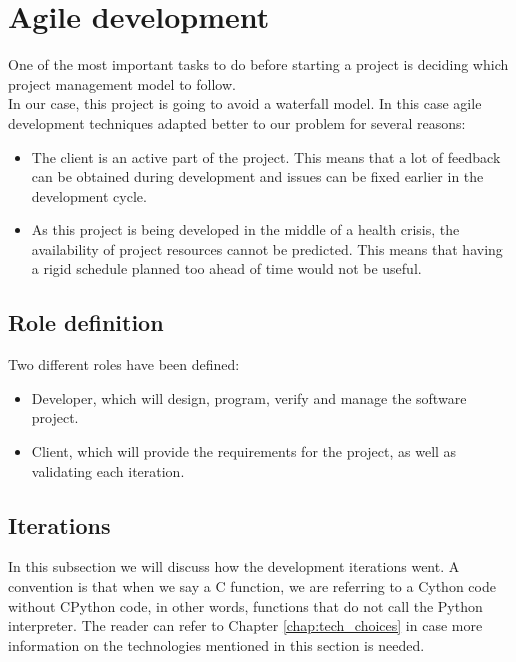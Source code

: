 \section{Agile development}

    One of the most important tasks to do before starting a project is deciding
    which project management model to follow.\\

    In our case, this project is going to avoid a waterfall model. In this case
    agile development techniques adapted better to our problem for several reasons:
    \begin{itemize}
      \item The client is an active part of the project. This means that
      a lot of feedback can be obtained during development and issues can be fixed
      earlier in the development cycle.
      \item As this project is being developed in the middle of a health crisis,
      the availability of project resources cannot be predicted. This means
      that having a rigid schedule planned too ahead of time would not  be
      useful.
    \end{itemize}

    \subsection{Role definition}

    Two different roles have been defined:
    \begin{itemize}
      \item Developer, which will design, program, verify and manage the
      software project.
      \item Client, which will provide the requirements for the project, as well
      as validating each iteration.
    \end{itemize}

    \subsection{Iterations}

      In this subsection we will discuss how the development iterations went.
      A convention is that when we say a C function, we are referring to a Cython
      code without CPython code, in other words, functions that do not call the
      Python interpreter. The reader can refer to Chapter \ref{chap:tech_choices}
      in case more information on the technologies mentioned in this
      section is needed.

